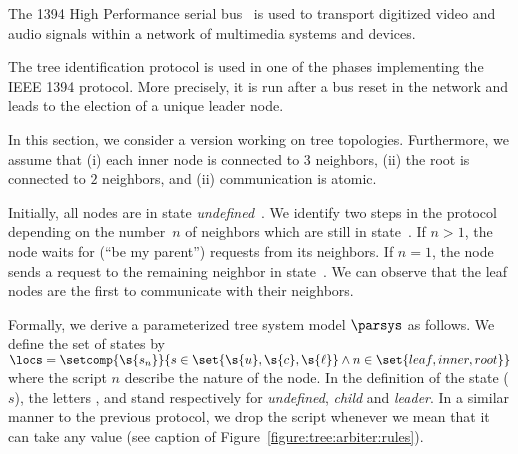 
The 1394 High Performance serial bus~\cite{ieee:1394:firewire} is used
to transport digitized video and audio signals within a network of
multimedia systems and devices.
% 

The tree identification protocol is used in one of the phases
implementing the IEEE 1394 protocol.
%
More precisely, it is run after a bus reset in the network and leads
to the election of a unique leader node.

In this section, we consider a version working on tree topologies.
%
Furthermore, we assume that (i) each inner node is connected to $3$
neighbors, (ii) the root is connected to $2$ neighbors, and (ii)
communication is atomic.

Initially, all nodes are in state \emph{undefined}~. 
%
We identify two steps in the protocol depending on the number~$n$ of
neighbors which are still in state~.
%
If $n>1$, the node waits for (``be my parent'') requests from its neighbors. 
%
If $n=1$, the node sends a request to the remaining neighbor in state~. 
%
We can observe that the leaf nodes are the first to communicate with
their neighbors.

Formally, we derive a parameterized tree system model $\parsys$ as follows.
%
We define the set of states by
$\locs=\setcomp{\s{\ensuremath{s_n}}}{s\in\set{\s{u},\s{c},\s{\ensuremath{\ell}}}\wedge
  n\in\set{leaf,inner,root}}$
where the script $n$ describe the nature of the node.
%
In the definition of the state ($s$), the letters ,  and
\s{$\ell$} stand respectively for \emph{undefined}, \emph{child} and
\emph{leader}.
%
In a similar manner to the previous protocol, we drop the script
whenever we mean that it can take any value (see caption of
Figure~\ref{figure:tree:arbiter:rules}).
% 

